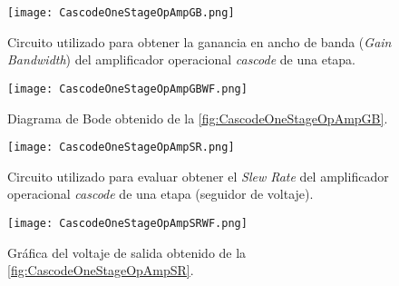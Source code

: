 \begin{figure}[ht]
	\centering
	\texttt{[image: CascodeOneStageOpAmpGB.png]}
	\caption{Circuito utilizado para obtener la ganancia en ancho de banda (\textit{Gain Bandwidth}) del amplificador operacional \textit{cascode} de una etapa. \label{fig:CascodeOneStageOpAmpGB}}
\end{figure}

\begin{figure}[ht]
	\centering
	\texttt{[image: CascodeOneStageOpAmpGBWF.png]}
	\caption{Diagrama de Bode obtenido de la \autoref{fig:CascodeOneStageOpAmpGB}. \label{fig:CascodeOneStageOpAmpGBWF}}
\end{figure}

\begin{figure}[ht]
	\centering
	\texttt{[image: CascodeOneStageOpAmpSR.png]}
	\caption{Circuito utilizado para evaluar obtener el \textit{Slew Rate} del amplificador operacional \textit{cascode} de una etapa (seguidor de voltaje). \label{fig:CascodeOneStageOpAmpSR}}
\end{figure}

\begin{figure}[ht]
	\centering
	\texttt{[image: CascodeOneStageOpAmpSRWF.png]}
	\caption{Gráfica del voltaje de salida obtenido de la \autoref{fig:CascodeOneStageOpAmpSR}. \label{fig:CascodeOneStageOpAmpSRWF}}
\end{figure}